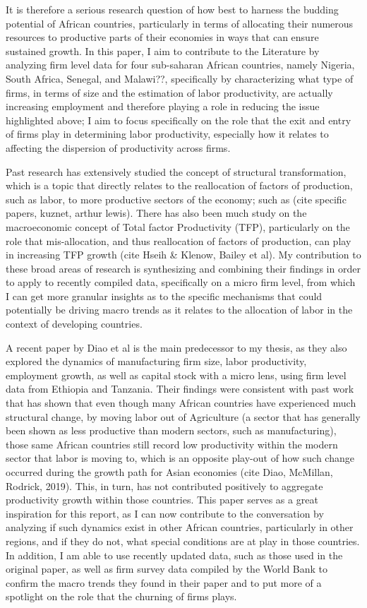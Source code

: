 \documentclass[
  12pt,
  letterpaper,
  DIV=11,
  numbers=noendperiod]{scrartcl}
\begin{document}
It is therefore a serious research question of how best to harness the
budding potential of African countries, particularly in terms of
allocating their numerous resources to productive parts of their
economies in ways that can ensure sustained growth. In this paper, I aim
to contribute to the Literature by analyzing firm level data for four
sub-saharan African countries, namely Nigeria, South Africa, Senegal,
and Malawi??, specifically by characterizing what type of firms, in
terms of size and the estimation of labor productivity, are actually
increasing employment and therefore playing a role in reducing the issue
highlighted above; I aim to focus specifically on the role that the exit
and entry of firms play in determining labor productivity, especially
how it relates to affecting the dispersion of productivity across firms.

Past research has extensively studied the concept of structural
transformation, which is a topic that directly relates to the
reallocation of factors of production, such as labor, to more productive
sectors of the economy; such as (cite specific papers, kuznet, arthur
lewis). There has also been much study on the macroeconomic concept of
Total factor Productivity (TFP), particularly on the role that
mis-allocation, and thus reallocation of factors of production, can play
in increasing TFP growth (cite Hseih \& Klenow, Bailey et al). My
contribution to these broad areas of research is synthesizing and
combining their findings in order to apply to recently compiled data,
specifically on a micro firm level, from which I can get more granular
insights as to the specific mechanisms that could potentially be driving
macro trends as it relates to the allocation of labor in the context of
developing countries.

A recent paper by Diao et al is the main predecessor to my thesis, as
they also explored the dynamics of manufacturing firm size, labor
productivity, employment growth, as well as capital stock with a micro
lens, using firm level data from Ethiopia and Tanzania. Their findings
were consistent with past work that has shown that even though many
African countries have experienced much structural change, by moving
labor out of Agriculture (a sector that has generally been shown as less
productive than modern sectors, such as manufacturing), those same
African countries still record low productivity within the modern sector
that labor is moving to, which is an opposite play-out of how such
change occurred during the growth path for Asian economies (cite Diao,
McMillan, Rodrick, 2019). This, in turn, has not contributed positively
to aggregate productivity growth within those countries. This paper
serves as a great inspiration for this report, as I can now contribute
to the conversation by analyzing if such dynamics exist in other African
countries, particularly in other regions, and if they do not, what
special conditions are at play in those countries. In addition, I am
able to use recently updated data, such as those used in the original
paper, as well as firm survey data compiled by the World Bank to confirm
the macro trends they found in their paper and to put more of a
spotlight on the role that the churning of firms plays.
\end{document}
